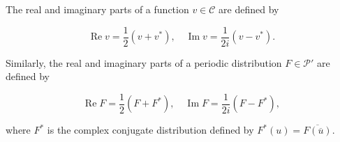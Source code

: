 The real and imaginary parts of a function $v \in \mathcal{C}$ are defined by

$$\operatorname{Re} v = \frac{1}{2}(v + v^*), \quad \operatorname{Im} v = \frac{1}{2i}(v - v^*).$$

Similarly, the real and imaginary parts of a periodic distribution $F \in \mathcal{P}'$ are defined by

$$\operatorname{Re} F = \frac{1}{2}(F + F^*), \quad \operatorname{Im} F = \frac{1}{2i}(F - F^*),$$

where $F^*$ is the complex conjugate distribution defined by $F^*(u) = \overline{F(\overline{u})}$.
